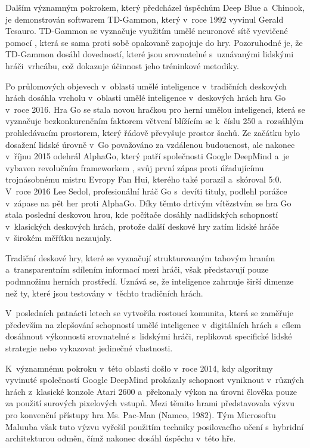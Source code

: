 Dalším významným pokrokem, který předcházel úspěchům Deep Blue a~Chinook, je demonstrován softwarem TD-Gammon\cite{WikiTD}, který v~roce 1992 vyvinul Gerald Tesauro. TD-Gammon se vyznačuje využitím umělé neuronové sítě vycvičené pomocí , která se sama proti sobě opakovaně zapojuje do hry. Pozoruhodné je, že TD-Gammon dosáhl dovedností, které jsou srovnatelné s~uznávanými lidskými hráči~vrhcábu, což dokazuje účinnost jeho tréninkové metodiky.

Po průlomových objevech v~oblasti umělé inteligence v~tradičních deskových hrách dosáhla vrcholu v~oblasti umělé inteligence v~deskových hrách hra Go v~roce 2016. Hra Go se stala novou hračkou pro herní umělou inteligenci, která se vyznačuje bezkonkurenčním faktorem větvení blížícím se k~číslu 250 a~rozsáhlým prohledávacím prostorem, který řádově převyšuje prostor šachů. Ze začátku bylo dosažení lidské úrovně v~Go považováno za vzdálenou budoucnost, ale nakonec v~říjnu 2015 odehrál AlphaGo, který patří společnosti Google DeepMind a~je vybaven revolučním frameworkem , svůj první zápas proti úřadujícímu trojnásobnému mistru Evropy Fan Hui, kterého také porazil a~skóroval 5:0. V~roce 2016 Lee Sedol, profesionální hráč Go s~devíti tituly, podlehl porážce v~zápase na pět her proti AlphaGo. Díky těmto drtivým vítězstvím se hra Go stala poslední deskovou hrou, kde počítače dosáhly nadlidských schopností v~klasických deskových hrách, protože další deskové hry zatím lidské hráče v~širokém měřítku nezaujaly\cite{AlphaGo}.

Tradiční deskové hry, které se vyznačují strukturovaným tahovým hraním a~transparentním sdílením informací mezi hráči, však představují pouze podmnožinu herních prostředí. Uznává se, že inteligence zahrnuje širší dimenze než ty, které jsou testovány v~těchto tradičních hrách.

V~posledních patnácti letech se vytvořila rostoucí komunita, která se zaměřuje především na zlepšování schopností umělé inteligence v~digitálních hrách s~cílem dosáhnout výkonnosti srovnatelné s~lidskými hráči, replikovat specifické lidské strategie nebo vykazovat jedinečné vlastnosti.

K~významnému pokroku v~této oblasti došlo v~roce 2014, kdy algoritmy vyvinuté společností Google DeepMind prokázaly schopnost vyniknout v~různých hrách z~klasické konzole Atari 2600 a~překonaly výkon na úrovni člověka pouze za použití surových pixelových vstupů. Mezi těmito hrami představovala výzvu pro konvenční přístupy hra Ms. Pac-Man (Namco, 1982). Tým Microsoftu Maluuba však tuto výzvu vyřešil použitím techniky posilovacího učení s~hybridní architekturou odměn, čímž nakonec dosáhl úspěchu v~této hře.

